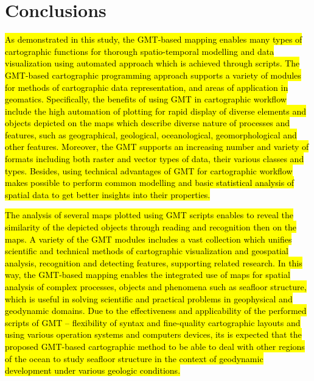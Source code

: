\documentclass[geomatics,article,submit,pdftex,moreauthors]{Definitions/mdpi}
\begin{document}
\section{Conclusions}

\hl{As demonstrated in this study, the GMT-based mapping enables many types of cartographic functions for thorough spatio-temporal modelling and data visualization using automated approach which is achieved through scripts. The GMT-based cartographic programming approach supports a variety of modules for methods of cartographic data representation, and areas of application in geomatics. Specifically, the benefits of using GMT in cartographic workflow include the high automation of plotting for rapid display of diverse elements and objects depicted on the maps which describe diverse nature of processes and features, such as geographical, geological, oceanological, geomorphological and other features. Moreover, the GMT supports an increasing number and variety of formats including both raster and vector types of data, their various classes and types. Besides, using technical advantages of GMT for cartographic workflow makes possible to perform common modelling and basic statistical analysis of spatial data to get better insights into their properties.}

\hl{The analysis of several maps plotted using GMT scripts enables to reveal the similarity of the depicted objects through reading and recognition then on the maps. A variety of the GMT modules includes a vast collection which unifies scientific and technical methods of cartographic visualization and geospatial analysis, recognition and detecting features, supporting related research. In this way, the GMT-based mapping enables the integrated use of maps for spatial analysis of complex processes, objects and phenomena such as seafloor structure, which is useful in solving scientific and practical problems in geophysical and geodynamic domains. Due to the effectiveness and applicability of the performed scripts of GMT -- flexibility of syntax and fine-quality cartographic layouts and using various operation systems and computers devices, its is expected that the proposed GMT-based cartographic method to be able to deal with other regions of the ocean to study seafloor structure in the context of geodynamic development under various geologic conditions. }
\end{document}
